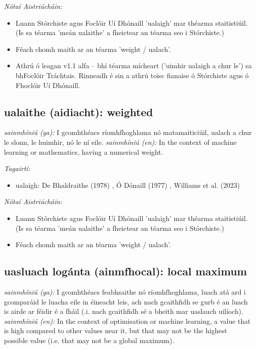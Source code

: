 \documentclass{article}
\begin{document}
 \noindent \textit{Nótaí Aistriúcháin:}
\begin{itemize}
	\item Luann Stórchiste agus Foclóir Uí Dhónaill 'ualaigh' mar théarma staitistiúil. (Is sa téarma 'meán ualaithe' a fheictear an téarma seo i Stórchiste.)
	\item Féach chomh maith ar an téarma 'weight / ualach'.
	\item Athrú ó leagan v1.1 alfa -- bhí téarma mícheart ('uimhir ualaigh a chur le') sa bhFoclóir Tráchtais. Rinneadh é sin a athrú toisc fianaise ó Stórchiste agus ó Fhoclóir Uí Dhónaill.
\end{itemize}


\subsection*{ualaithe (aidiacht): weighted} 
 \noindent \textit{sainmhíniú (ga):} I gcomhthéacs ríomhfhoghlama nó matamaiticiúil, ualach a chur le slonn, le huimhir, nó le ní eile.
\newline\newline
 \noindent \textit{sainmhíniú (en):} In the context of machine learning or mathematics, having a numerical weight.
\newline

 \noindent \textit{Tagairtí:}
\begin{itemize}
	\item ualaigh: De Bhaldraithe (1978) \cite{de-bhaldraithe}, Ó Dónaill (1977) \cite{odonaill}, Williams et al. (2023) \cite{storchiste}
\end{itemize}

 \noindent \textit{Nótaí Aistriúcháin:}
\begin{itemize}
	\item Luann Stórchiste agus Foclóir Uí Dhónaill 'ualaigh' mar théarma staitistiúil. (Is sa téarma 'meán ualaithe' a fheictear an téarma seo i Stórchiste.)
	\item Féach chomh maith ar an téarma 'weight / ualach'.
\end{itemize}


\subsection*{uasluach logánta (ainmfhocal): local maximum} 
 \noindent \textit{sainmhíniú (ga):} I gcomhthéacs feabhsaithe nó ríomhfhoghlama, luach atá ard i gcomparáid le luacha eile in éineacht leis, ach nach gcaithfidh se gurb é an luach is airde ar féidir é a fháil (.i. nach gcaithfidh sé a bheith mar uaslauch uilíoch).
\newline\newline
 \noindent \textit{sainmhíniú (en):} In the context of optimisation or machine learning, a value that is high compared to other values near it, but that may not be the highest possible value (i.e. that may not be a global maximum).
\newline
\end{document}
